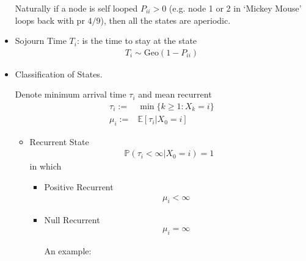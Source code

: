 \begin{itemize}[topsep=2pt,itemsep=0pt]
        Naturally if a node is self looped $ P_{ii}>0 $ (e.g. node 1 or 2 in `Mickey Mouse' loops back with pr $ 4/9 $), then all the states are aperiodic.
        \item Sojourn Time $ T_i $: is the time to stay at the state
        \begin{align*}
            T_i\sim \mathrm{Geo}(1-P_{ii})  
        \end{align*}
        \item Classification of States. 
        
        Denote minimum arrival time $ \tau_i $ and mean recurrent
        \begin{align*}
            \tau_i:=&\min\{k\geq 1:X_k=i\}\\
            \mu _i:=&\mathbb{E}\left[ \tau_i|X_0=i \right] 
        \end{align*}
        
        \begin{itemize}[topsep=2pt,itemsep=0pt]
            \item Recurrent State
            \begin{align*}
                \mathbb{P}\left( \tau_i<\infty|X_0=i    \right)=1  
            \end{align*}
            in which 
            \begin{itemize}[topsep=2pt,itemsep=0pt]
                \item Positive Recurrent
                \begin{align*}
                    \mu _i<\infty 
                \end{align*}
                \item Null Recurrent
                \begin{align*}
                    \mu _i=\infty 
                \end{align*}

                An example:
                \begin{center}
\end{center}
\end{itemize}
\end{itemize}
\end{itemize}
